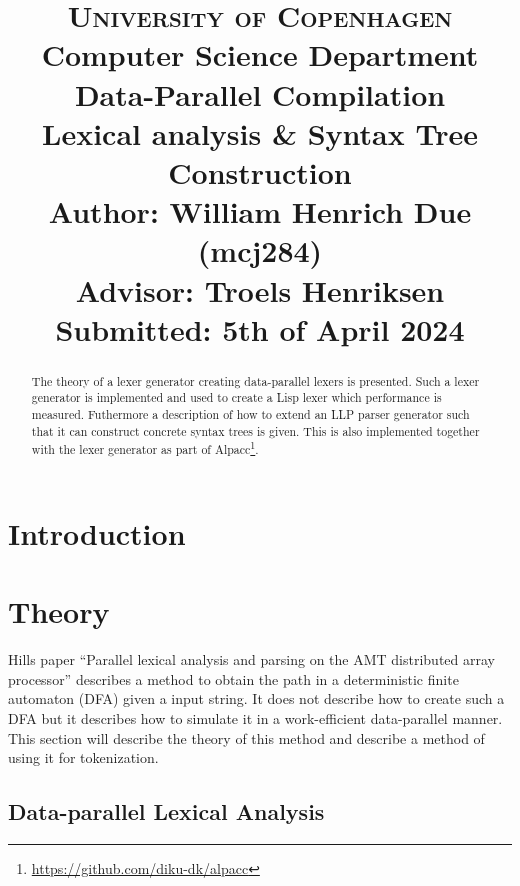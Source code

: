 \documentclass[a4paper,12pt]{article}
\title{
    {\Large \textsc{University of Copenhagen}} \\[0pt]
    {\large Computer Science Department} \\[10pt]
    {\Large Data-Parallel Compilation} \\[4pt]
    {\large Lexical analysis \& Syntax Tree Construction} \\[10pt]
    Author: William Henrich Due (mcj284) \\[0pt]
    Advisor: Troels Henriksen \\[0pt]
    Submitted: 5th of April 2024
}
\author{}
\date{}
\theoremstyle{definition}
\begin{document}
\maketitle
\thispagestyle{firstpage}
\begin{abstract}
    \noindent The theory of a lexer generator creating data-parallel lexers is presented. Such a lexer generator is implemented and used to create a Lisp lexer which performance is measured. Futhermore a description of how to extend an LLP parser generator such that it can construct concrete syntax trees is given. This is also implemented together with the lexer generator as part of Alpacc\footnote{\href{https://github.com/diku-dk/alpacc}{https://github.com/diku-dk/alpacc}}.
\end{abstract}

\tableofcontents

\section{Introduction}


\section{Theory}
Hills paper ``Parallel lexical analysis and parsing on the AMT
distributed array processor'' \cite{HILL1992699} describes a method to obtain the path in a deterministic finite automaton (DFA) given a input string. It does not describe how to create such a DFA but it describes how to simulate it in a work-efficient data-parallel manner. This section will describe the theory of this method and describe a method of using it for tokenization.

\subsection{Data-parallel Lexical Analysis}
\end{document}
